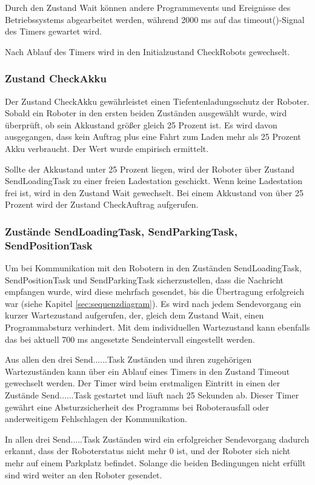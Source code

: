 Durch den Zustand Wait können andere Programmevents und Ereignisse des Betriebssystems abgearbeitet werden, während 2000 ms auf das timeout()-Signal des Timers gewartet wird. 

Nach Ablauf des Timers wird in den Initialzustand CheckRobots gewechselt.

\subsubsection{Zustand CheckAkku}

Der Zustand CheckAkku gewährleistet einen Tiefentenladungsschutz der Roboter. Sobald ein Roboter in den ersten beiden Zuständen ausgewählt wurde, wird überprüft, ob sein Akkustand größer gleich 25 Prozent ist. Es wird davon ausgegangen, dass kein Auftrag plus eine Fahrt zum Laden mehr als 25 Prozent Akku verbraucht. Der Wert wurde empirisch ermittelt. 

Sollte der Akkustand unter 25 Prozent liegen, wird der Roboter über Zustand SendLoadingTask zu einer freien Ladestation geschickt. Wenn keine Ladestation frei ist, wird in den Zustand Wait gewechselt. 
Bei einem Akkustand von über 25 Prozent wird der Zustand CheckAuftrag aufgerufen. 

\subsubsection{Zustände SendLoadingTask, SendParkingTask, SendPositionTask}

Um bei Kommunikation mit den Robotern in den Zuständen SendLoadingTask, SendPositionTask und SendParkingTask sicherzustellen, dass die Nachricht empfangen wurde, wird diese mehrfach gesendet, bis die Übertragung erfolgreich war (siehe Kapitel \ref{sec:sequenzdiagram}). Es wird nach jedem Sendevorgang ein kurzer Wartezustand aufgerufen, der, gleich dem Zustand Wait, einen Programmabsturz verhindert. Mit dem individuellen Wartezustand kann ebenfalls das bei aktuell 700 ms angesetzte Sendeintervall eingestellt werden. 

Aus allen den drei Send......Task Zuständen und ihren zugehörigen Wartezuständen kann über ein Ablauf eines Timers in den Zustand Timeout gewechselt werden. Der Timer wird beim erstmaligen Eintritt in einen der Zustände Send......Task gestartet und läuft nach 25 Sekunden ab. Dieser Timer gewährt eine Absturzsicherheit des Programms bei Roboterausfall oder anderweitigem Fehlschlagen der Kommunikation. 

In allen drei Send.....Task Zuständen wird ein erfolgreicher Sendevorgang dadurch erkannt, dass der Roboterstatus nicht mehr 0 ist, und der Roboter sich nicht mehr auf einem Parkplatz befindet. Solange die beiden Bedingungen nicht erfüllt sind wird weiter an den Roboter gesendet. 

